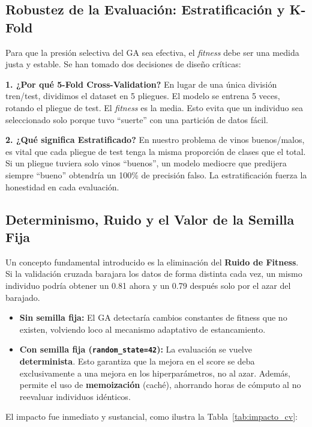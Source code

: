 \documentclass[12pt, a4paper]{article}
\begin{document}
\subsection{Robustez de la Evaluación: Estratificación y K-Fold}

Para que la presión selectiva del GA sea efectiva, el \textit{fitness} debe ser una
medida justa y estable. Se han tomado dos decisiones de diseño críticas:

\textbf{1. ¿Por qué 5-Fold Cross-Validation?}
En lugar de una única división tren/test, dividimos el dataset en 5 pliegues. El modelo
se entrena 5 veces, rotando el pliegue de test. El \textit{fitness} es la media. Esto
evita que un individuo sea seleccionado solo porque tuvo ``suerte'' con una partición de
datos fácil.

\textbf{2. ¿Qué significa Estratificado?}
En nuestro problema de vinos buenos/malos, es vital que cada pliegue de test tenga la
misma proporción de clases que el total. Si un pliegue tuviera solo vinos ``buenos'', un
modelo mediocre que predijera siempre ``bueno'' obtendría un 100\% de precisión falso.
La estratificación fuerza la honestidad en cada evaluación.

\subsection{Determinismo, Ruido y el Valor de la Semilla Fija}

Un concepto fundamental introducido es la eliminación del \textbf{Ruido de Fitness}. Si
la validación cruzada barajara los datos de forma distinta cada vez, un mismo individuo
podría obtener un 0.81 ahora y un 0.79 después solo por el azar del barajado.
\begin{itemize}[itemsep=0.2em]
  \item \textbf{Sin semilla fija:} El GA detectaría cambios constantes de fitness que no
        existen, volviendo loco al mecanismo adaptativo de estancamiento.
  \item \textbf{Con semilla fija (\texttt{random\_state=42}):} La evaluación se vuelve
        \textbf{determinista}. Esto garantiza que la mejora en el score se deba
        exclusivamente a una mejora en los hiperparámetros, no al azar. Además, permite el
        uso de \textbf{memoización} (caché), ahorrando horas de cómputo al no reevaluar
        individuos idénticos.
\end{itemize}

El impacto fue inmediato y sustancial, como ilustra la Tabla~\ref{tab:impacto_cv}:
\end{document}
